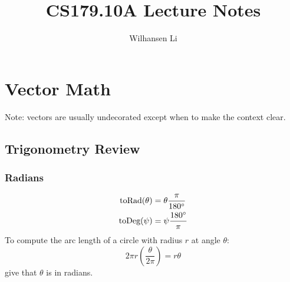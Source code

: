 \documentclass[12pt]{report}
\title{CS179.10A Lecture Notes}
\author{Wilhansen Li}
\begin{document}
\maketitle
\tableofcontents
	
\chapter{Vector Math}
Note: vectors are usually undecorated except when to make the context clear.
\section{Trigonometry Review}
\subsection{Radians}
\begin{align*}
	\text{toRad}(\theta) & = \theta \frac{\pi}{180\degree} \\
	\text{toDeg}(\psi)   & = \psi\frac{180\degree}{\pi}    
\end{align*}
To compute the arc length of a circle with radius $r$ at angle $\theta$:
$$
2\pi r \left(\frac{\theta}{2\pi}\right) = r\theta
$$
give that $\theta$ is in radians.
\end{document}
